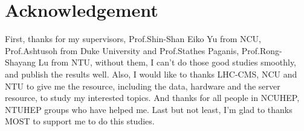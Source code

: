 \documentclass[12pt,twoside,a4paper,an,final]{cms-tdr}
\begin{document}
\section{Acknowledgement}
First, thanks for my supervisors, Prof.Shin-Shan Eiko Yu from NCU, Prof.Ashtusoh from Duke University and Prof.Stathes Paganis, Prof.Rong-Shayang Lu from NTU, without them, I can't do those good studies smoothly, and publish the results well. Also, I would like to thanks LHC-CMS, NCU and NTU to give me the resource, including the data, hardware and the server resource, to study my interested topics. And thanks for all people in NCUHEP, NTUHEP groups who have helped me. Last but not least, I'm glad to thanks MOST to support me to do this studies. 
\end{document}
